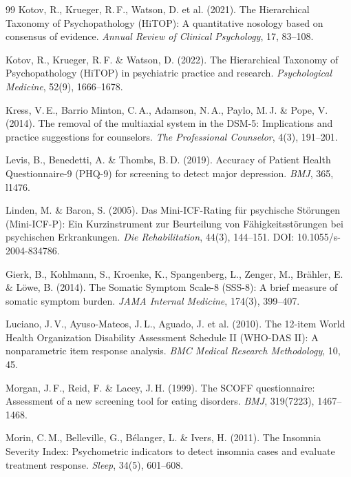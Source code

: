 \documentclass[11pt,a4paper]{article}
\begin{document}
\begin{thebibliography}{99}
Kotov, R., Krueger, R.\,F., Watson, D. et al. (2021).
\newblock The Hierarchical Taxonomy of Psychopathology (HiTOP): A quantitative nosology based on consensus of evidence.
\newblock \textit{Annual Review of Clinical Psychology}, 17, 83--108.

Kotov, R., Krueger, R.\,F. \& Watson, D. (2022).
\newblock The Hierarchical Taxonomy of Psychopathology (HiTOP) in psychiatric practice and research.
\newblock \textit{Psychological Medicine}, 52(9), 1666--1678.

Kress, V.\,E., Barrio Minton, C.\,A., Adamson, N.\,A., Paylo, M.\,J. \& Pope, V. (2014).
\newblock The removal of the multiaxial system in the DSM-5: Implications and practice suggestions for counselors.
\newblock \textit{The Professional Counselor}, 4(3), 191--201.

Levis, B., Benedetti, A. \& Thombs, B.\,D. (2019).
\newblock Accuracy of Patient Health Questionnaire-9 (PHQ-9) for screening to detect major depression.
\newblock \textit{BMJ}, 365, l1476.

Linden, M. \& Baron, S. (2005).
\newblock Das Mini-ICF-Rating f\"ur psychische St\"orungen (Mini-ICF-P): Ein Kurzinstrument zur Beurteilung von F\"ahigkeitsst\"orungen bei psychischen Erkrankungen.
\newblock \textit{Die Rehabilitation}, 44(3), 144--151. DOI: 10.1055/s-2004-834786.

Gierk, B., Kohlmann, S., Kroenke, K., Spangenberg, L., Zenger, M., Br\"ahler, E. \& L\"owe, B. (2014).
\newblock The Somatic Symptom Scale-8 (SSS-8): A brief measure of somatic symptom burden.
\newblock \textit{JAMA Internal Medicine}, 174(3), 399--407.

Luciano, J.\,V., Ayuso-Mateos, J.\,L., Aguado, J. et al. (2010).
\newblock The 12-item World Health Organization Disability Assessment Schedule II (WHO-DAS II): A nonparametric item response analysis.
\newblock \textit{BMC Medical Research Methodology}, 10, 45.

Morgan, J.\,F., Reid, F. \& Lacey, J.\,H. (1999).
\newblock The SCOFF questionnaire: Assessment of a new screening tool for eating disorders.
\newblock \textit{BMJ}, 319(7223), 1467--1468.

Morin, C.\,M., Belleville, G., B\'elanger, L. \& Ivers, H. (2011).
\newblock The Insomnia Severity Index: Psychometric indicators to detect insomnia cases and evaluate treatment response.
\newblock \textit{Sleep}, 34(5), 601--608.


\end{thebibliography}
\end{document}

